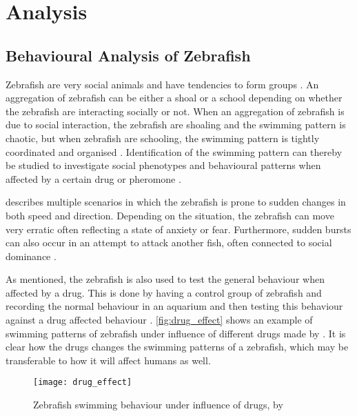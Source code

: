 \graphicspath{{figures/intro/}}
\chapter{Analysis}\label{ch:analysis}



\section{Behavioural Analysis of Zebrafish}
Zebrafish are very social animals and have tendencies to form groups \citep{RahmanKhan2018}. An aggregation of zebrafish can be either a shoal or a school depending on whether the zebrafish are interacting socially or not. When an aggregation of zebrafish is due to social interaction, the zebrafish are shoaling and the swimming pattern is chaotic, but when zebrafish are schooling, the swimming pattern is tightly coordinated and organised \citep{Miller2012a}. Identification of the swimming pattern can thereby be studied to investigate social phenotypes and behavioural patterns when affected by a certain drug or pheromone \citep{RahmanKhan2018}. 

\cite{Kalueff2013} describes multiple scenarios in which the zebrafish is prone to sudden changes in both speed and direction. Depending on the situation, the zebrafish can move very erratic often reflecting a state of anxiety or fear. Furthermore, sudden bursts can also occur in an attempt to attack another fish, often connected to social dominance \citep{Kalueff2013}.

As mentioned, the zebrafish is also used to test the general behaviour when affected by a drug. This is done by having a control group of zebrafish and recording the normal behaviour in an aquarium and then testing this behaviour against a drug affected behaviour \citep{Stewart2015}. \autoref{fig:drug_effect} shows an example of swimming patterns of zebrafish under influence of different drugs made by \cite{Stewart2015}. It is clear how the drugs changes the swimming patterns of a zebrafish, which may be transferable to how it will affect humans as well.\\ 

\begin{figure}[h]
	\centering
	\texttt{[image: drug\_effect]}
	\caption{Zebrafish swimming behaviour under influence of drugs, by \cite{Stewart2015}}
	\label{fig:drug_effect}
\end{figure}


